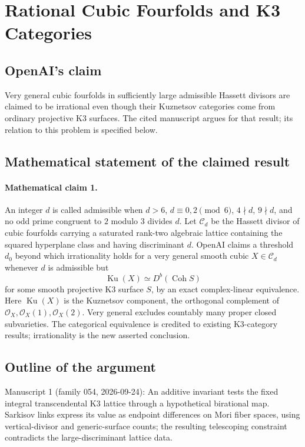 \documentclass[11pt]{article}
\begin{document}
\section*{Rational Cubic Fourfolds and K3 Categories}

\subsection{OpenAI's claim}
Very general cubic fourfolds in sufficiently large admissible Hassett divisors are claimed to be irrational even though their Kuznetsov categories come from ordinary projective K3 surfaces. The cited manuscript argues for that result; its relation to this problem is specified below.

\subsection{Mathematical statement of the claimed result}
\paragraph{Mathematical claim 1.} An integer $d$ is called admissible when $d>6$, $d\equiv0,2\pmod6$, $4\nmid d$, $9\nmid d$, and no odd prime congruent to $2$ modulo $3$ divides $d$. Let $\mathcal C_d$ be the Hassett divisor of cubic fourfolds carrying a saturated rank-two algebraic lattice containing the squared hyperplane class and having discriminant $d$. OpenAI claims a threshold $d_0$ beyond which irrationality holds for a very general smooth cubic $X\in\mathcal C_d$ whenever $d$ is admissible but
\[
\operatorname{Ku}(X)\simeq D^b(\operatorname{Coh}S)
\]
for some smooth projective K3 surface $S$, by an exact complex-linear equivalence. Here $\operatorname{Ku}(X)$ is the Kuznetsov component, the orthogonal complement of $\mathcal O_X,\mathcal O_X(1),\mathcal O_X(2)$. Very general excludes countably many proper closed subvarieties. The categorical equivalence is credited to existing K3-category results; irrationality is the new asserted conclusion.

\subsection{Outline of the argument}
Manuscript 1 (family 054, 2026-09-24): An additive invariant tests the fixed integral transcendental K3 lattice through a hypothetical birational map. Sarkisov links express its value as endpoint differences on Mori fiber spaces, using vertical-divisor and generic-surface counts; the resulting telescoping constraint contradicts the large-discriminant lattice data.
\end{document}
